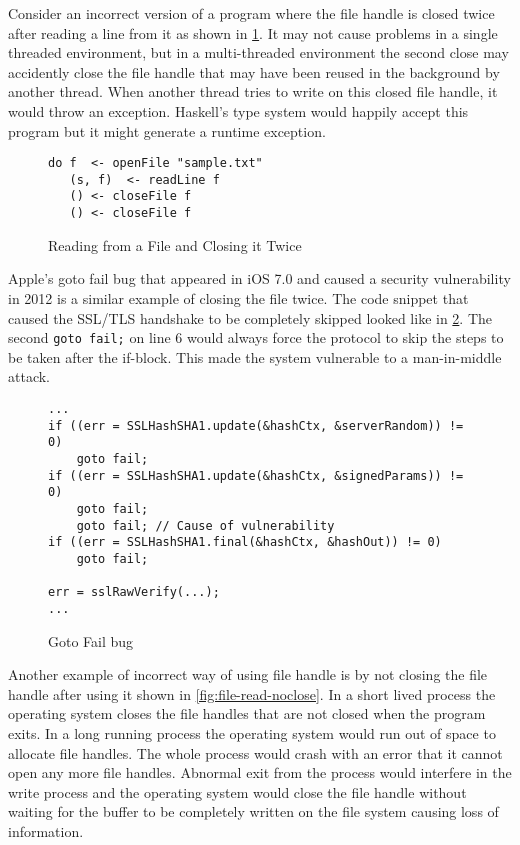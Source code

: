 Consider an incorrect version of a program where the file handle is closed twice after reading a line from it as shown in \cref{fig:file-read-close-2times}.
It may not cause problems in a single threaded environment, but in a multi-threaded environment
the second close may accidently close the file handle that may have been reused in the background by another thread.
When another thread tries to write on this closed file handle, it would throw an exception.
Haskell's type system would happily accept this program but it might generate a runtime exception.
\begin{figure}[h]
  \begin{framed}
    \begin{verbatim}
do f  <- openFile "sample.txt"
   (s, f)  <- readLine f
   () <- closeFile f
   () <- closeFile f
    \end{verbatim}
  \end{framed}
  \caption{Reading from a File and Closing it Twice}
  \label{fig:file-read-close-2times}
\end{figure}

Apple's goto fail bug that appeared in iOS 7.0 and caused a security vulnerability in 2012 is a similar example of closing the file twice.
The code snippet that caused the SSL/TLS handshake to be completely skipped looked like in \cref{fig:goto-fail}.
The second \texttt{goto fail;} on line 6 would always force the protocol to skip the
steps to be taken after the if-block. This made the system vulnerable to a man-in-middle attack.
\begin{figure}[h]
  \begin{framed}
\begin{verbatim}
...
if ((err = SSLHashSHA1.update(&hashCtx, &serverRandom)) != 0)
    goto fail;
if ((err = SSLHashSHA1.update(&hashCtx, &signedParams)) != 0)
    goto fail;
    goto fail; // Cause of vulnerability
if ((err = SSLHashSHA1.final(&hashCtx, &hashOut)) != 0)
    goto fail;

err = sslRawVerify(...);
...
\end{verbatim}
  \end{framed}
  \caption{Goto Fail bug}
  \label{fig:goto-fail}
\end{figure}

Another example of incorrect way of using file handle is by not closing the file handle after using it shown in \cref{fig:file-read-noclose}.
In a short lived process the operating system closes the file handles that are not closed when the program exits.
In a long running process the operating system would run out of space to allocate file handles. The whole process would crash with an error that
it cannot open any more file handles. Abnormal exit from the process would interfere in the write process
and the operating system would close the file handle without waiting for the buffer to be completely
written on the file system causing loss of information.


